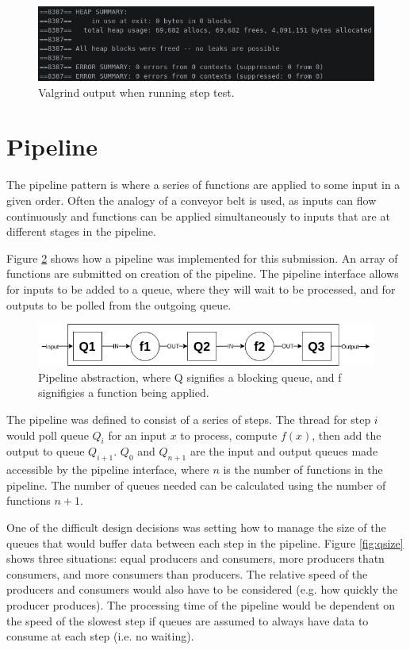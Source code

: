 \documentclass[12pt]{article}
\begin{document}
\begin{figure}[!ht]
	\centering 
	\includegraphics[width=\linewidth]{images/stepgrind}
	\caption{Valgrind output when running step test.}
	\label{fig:stepgrind}
\end{figure}

\section{Pipeline} 

The pipeline pattern is where a series of functions are applied to some input in a given order. Often the analogy of a conveyor belt is used, as inputs can flow continuously and functions can be applied simultaneously to inputs that are at different stages in the pipeline.

Figure \ref{fig:pipe} shows how a pipeline was implemented for this submission. An array of functions are submitted on creation of the pipeline. The pipeline interface allows for inputs to be added to a queue, where they will wait to be processed, and for outputs to be polled from the outgoing queue. 

\begin{figure}[!ht]
	\centering 
	\includegraphics[width=\linewidth]{images/pipe}
	\caption{Pipeline abstraction, where Q signifies a blocking queue, and f signifigies a function being applied.}
	\label{fig:pipe}
\end{figure}

The pipeline was defined to consist of a series of steps. The thread for step $i$ would poll queue $Q_i$ for an input $x$ to process, compute $f(x)$, then add the output to queue $Q_{i+1}$. $Q_0$ and $Q_{n+1}$ are the input and output queues made accessible by the pipeline interface, where $n$ is the number of functions in the pipeline. The number of queues needed can be calculated using the number of functions $n+1$. 

One of the difficult design decisions was setting how to manage the size of the queues that would buffer data between each step in the pipeline. Figure \ref{fig:qsize} shows three situations: equal producers and consumers, more producers thatn consumers, and more consumers than producers. The relative speed of the producers and consumers would also have to be considered (e.g. how quickly the producer produces). The processing time of the pipeline would be dependent on the speed of the slowest step if queues are assumed to always have data to consume at each step (i.e. no waiting).
\end{document}
